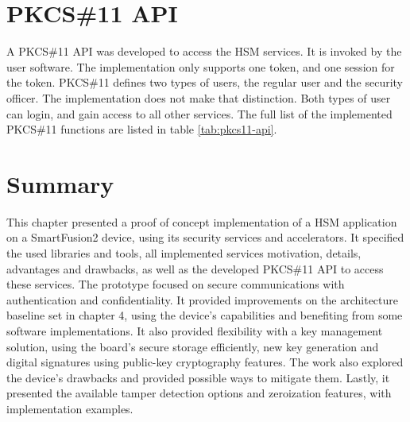 \section{PKCS\#11 API}\label{chap:implementation:app:pkcs}

A PKCS\#11 API was developed to access the HSM services. It is invoked by the user software.
The implementation only supports one token, and one session for the token.
PKCS\#11 defines two types of users, the regular user and the security officer. The implementation does not make that distinction. Both types of user can login, and gain access to all other services.
The full list of the implemented PKCS\#11 functions are listed in table \ref{tab:pkcs11-api}.

\section*{Summary}\label{chap:implementation:summary}

This chapter presented a proof of concept implementation of a HSM application on a SmartFusion2 device, using its security services and accelerators. It specified the used libraries and tools, all implemented services motivation, details, advantages and drawbacks,  as well as the developed PKCS\#11 API to access these services. The prototype focused on secure communications with authentication and confidentiality. It provided improvements on the architecture baseline set in chapter 4, using the device's capabilities and benefiting from some software implementations. It also provided flexibility with a key management solution, using the board's secure storage efficiently, new key generation and digital signatures using public-key cryptography features.
The work also explored the device's drawbacks and provided possible ways to mitigate them. Lastly, it presented the available tamper detection options and zeroization features, with implementation examples.

